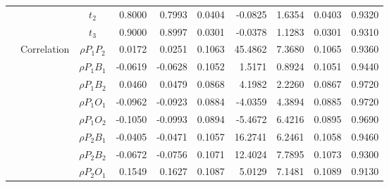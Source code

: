 \documentclass[letterpaper]{article}
\begin{document}
\begin{table}[h]
\begin{tabular}{cccrrrrrrr}
            &             & $t_2$          & 0.8000                 & 0.7993                 & 0.0404                 & -0.0825                & 1.6354                 & 0.0403                   & 0.9320                 \\
            &             & $t_3$          & 0.9000                 & 0.8997                 & 0.0301                 & -0.0378                & 1.1283                 & 0.0301                   & 0.9310                 \\
            & Correlation & $\rho{P_1P_2}$ & 0.0172                 & 0.0251                 & 0.1063                 & 45.4862                & 7.3680                 & 0.1065                   & 0.9360                 \\
            &             & $\rho{P_1B_1}$ & -0.0619                & -0.0628                & 0.1052                 & 1.5171                 & 0.8924                 & 0.1051                   & 0.9440                 \\
            &             & $\rho{P_1B_2}$ & 0.0460                 & 0.0479                 & 0.0868                 & 4.1982                 & 2.2260                 & 0.0867                   & 0.9720                 \\
            &             & $\rho{P_1O_1}$ & -0.0962                & -0.0923                & 0.0884                 & -4.0359                & 4.3894                 & 0.0885                   & 0.9720                 \\
            &             & $\rho{P_1O_2}$ & -0.1050                & -0.0993                & 0.0894                 & -5.4672                & 6.4216                 & 0.0895                   & 0.9690                 \\
            &             & $\rho{P_2B_1}$ & -0.0405                & -0.0471                & 0.1057                 & 16.2741                & 6.2461                 & 0.1058                   & 0.9460                 \\
            &             & $\rho{P_2B_2}$ & -0.0672                & -0.0756                & 0.1071                 & 12.4024                & 7.7895                 & 0.1073                   & 0.9300                 \\
            &             & $\rho{P_2O_1}$ & 0.1549                 & 0.1627                 & 0.1087                 & 5.0129                 & 7.1481                 & 0.1089                   & 0.9130                 \\

\end{tabular}
\end{table}
\end{document}

